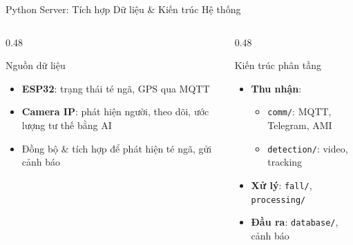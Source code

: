 \begin{frame}[fragile]{Python Server: Tích hợp Dữ liệu \& Kiến trúc Hệ thống}
    \small
    \begin{columns}[T]
        \begin{column}{0.48\textwidth}
            \begin{block}{Nguồn dữ liệu}
                \begin{itemize}\scriptsize
                    \item \textbf{ESP32}: trạng thái té ngã, GPS qua MQTT
                    \item \textbf{Camera IP}: phát hiện người, theo dõi, ước lượng tư thế bằng AI
                    \item Đồng bộ & tích hợp để phát hiện té ngã, gửi cảnh báo
                \end{itemize}
            \end{block}
        \end{column}

        \begin{column}{0.48\textwidth}
            \begin{block}{Kiến trúc phân tầng}
                \begin{itemize}\scriptsize
                    \item \textbf{Thu nhận}:
                        \begin{itemize}
                            \item \texttt{comm/}: MQTT, Telegram, AMI
                            \item \texttt{detection/}: video, tracking
                        \end{itemize}
                    \item \textbf{Xử lý}: \texttt{fall/}, \texttt{processing/}
                    \item \textbf{Đầu ra}: \texttt{database/}, cảnh báo
                \end{itemize}
            \end{block}
        \end{column}
    \end{columns}
    \normalsize
    \label{sec:server_overview}
\end{frame}

